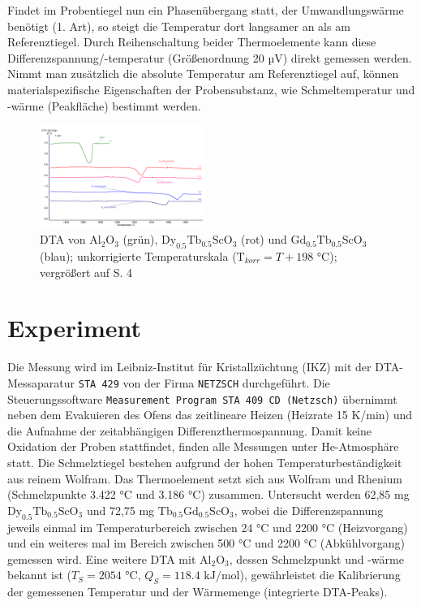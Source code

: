 \documentclass[aps,twocolumn,secnumarabic,nobalancelastpage,amsmath,amssymb,
nofootinbib,superscriptaddress]{revtex4-1}
\begin{document}
Findet im Probentiegel nun ein Phasenübergang statt, der Umwandlungswärme benötigt (1. Art), so steigt die Temperatur dort langsamer an als am Referenztiegel. Durch Reihenschaltung beider
Thermoelemente kann diese Differenzspannung/-temperatur (Größenordnung 20 $\text{µV}$) direkt gemessen werden. Nimmt man zusätzlich die absolute Temperatur am Referenztiegel auf, können materialspezifische Eigenschaften
der Probensubstanz, wie Schmeltemperatur und -wärme (Peakfläche) bestimmt werden.



\begin{figure}[t]
  \centering
   \includegraphics[width=0.48\textwidth]{../img/Messkurven_unsere.png}
  \caption{\label{fig:dtaDyTb+TbGd} DTA von $\text{Al}_{2}\text{O}_3$ (grün), $\text{Dy}_{0.5}\text{Tb}_{0.5}\text{ScO}_3$ (rot)
  und $\text{Gd}_{0.5}\text{Tb}_{0.5}\text{ScO}_3$ (blau); unkorrigierte Temperaturskala ($\text{T}_{korr}=T + 198\text{ °C}$); vergrößert auf S. 4}
\end{figure}

\section{Experiment}
\noindent Die Messung wird im Leibniz-Institut für Kristallzüchtung (IKZ) mit der DTA-Messaparatur \texttt{STA 429} von der Firma \texttt{NETZSCH} durchgeführt. Die Steuerungssoftware
\texttt{Measurement Program STA 409 CD (Netzsch)} übernimmt neben dem Evakuieren des Ofens das zeitlineare Heizen (Heizrate 15 K/min) und die Aufnahme der zeitabhängigen Differenzthermospannung.
Damit keine Oxidation der Proben stattfindet, finden alle Messungen unter He-Atmosphäre statt. Die Schmelztiegel bestehen aufgrund der hohen
Temperaturbeständigkeit aus reinem Wolfram. Das Thermoelement setzt sich aus Wolfram und Rhenium (Schmelzpunkte 3.422 °C und 3.186 °C) zusammen.
Untersucht werden 62,85 mg $\text{Dy}_{0.5}\text{Tb}_{0.5}\text{ScO}_3$ und 72,75 mg $\text{Tb}_{0.5}\text{Gd}_{0.5}\text{ScO}_3$, wobei die Differenzspannung jeweils
einmal im Temperaturbereich zwischen 24 °C und 2200 °C (Heizvorgang) und ein weiteres mal im Bereich zwischen 500 °C und 2200 °C (Abkühlvorgang) gemessen wird. Eine weitere DTA
mit $\text{Al}_2\text{O}_3$, dessen Schmelzpunkt und -wärme bekannt ist ($T_S=2054\text{ °C}$, $Q_S=118.4\text{ kJ/mol}$), gewährleistet die Kalibrierung der gemessenen Temperatur
und der Wärmemenge (integrierte DTA-Peaks).
\end{document}
